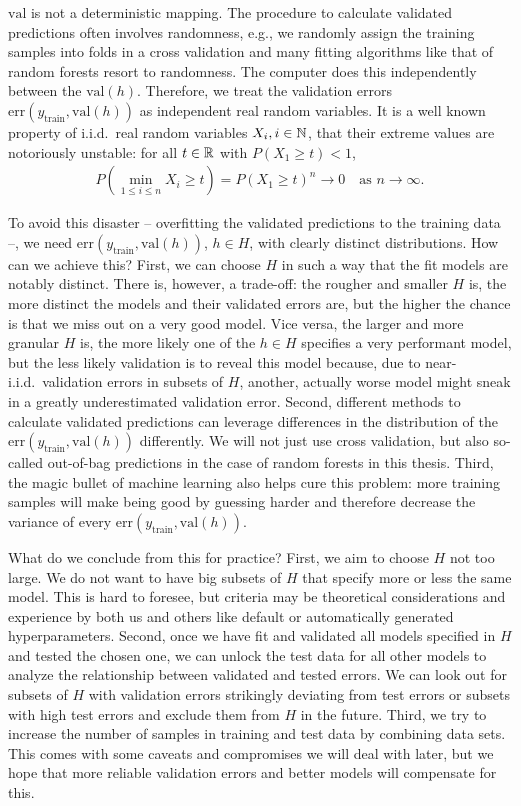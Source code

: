 $\text{val}$ is not a deterministic mapping. The procedure to calculate validated predictions often 
involves randomness, e.g., we randomly assign the training samples into folds in a cross validation 
and many fitting algorithms like that of random forests resort to randomness. The computer does this 
independently between the $\text{val}(h)$. Therefore, we treat the validation errors
$\text{err}(y_\text{train}, \text{val}(h))$ as independent 
real random variables. It is a well known property of i.i.d.\
real random variables $X_i, i \in \mathbb{N}$, that their extreme values are notoriously unstable: for all 
$t \in \mathbb{R}$ with $P(X_1 \geq t) < 1$, 
\begin{align}
    P\left( \min_{1 \leq i \leq n} X_i \geq t \right) = P(X_1 \geq t)^n \to 0 \quad
    \text{as } n \to \infty.
\end{align}

To avoid this disaster -- overfitting the validated predictions to the training 
data --, we need $\text{err}(y_\text{train}, \text{val}(h))$, $h \in H$, with clearly distinct 
distributions. 
How can we achieve this? First, we can choose $H$ in such a way that the fit models are 
notably distinct. There is, however, a trade-off: the rougher and smaller $H$ is, the more distinct 
the models and their validated errors are, but the higher the chance is that we miss out on a very good 
model. Vice versa, the larger and more granular $H$ is, the more likely one of the $h \in H$ 
specifies a very performant model, but the less likely validation is to reveal this model because,
due to near-i.i.d.\ validation errors in subsets of $H$, another, actually worse model might sneak 
in a greatly underestimated validation error. Second, different methods to calculate validated
predictions can leverage differences in the distribution of the 
$\text{err}(y_\text{train}, \text{val}(h))$ differently. We will not just use cross validation, but 
also so-called out-of-bag predictions in the case of random forests in this thesis. Third, the 
magic bullet of machine learning also helps cure this problem: more training samples will make 
being good by guessing harder and therefore decrease the variance of every 
$\text{err}(y_\text{train}, \text{val}(h))$.

What do we conclude from this for practice? First, we aim to choose $H$ not too large.
We do not want to have big subsets of $H$ that specify more or less the same model. This is hard 
to foresee, but criteria may be theoretical considerations and experience by both us and others 
like default or automatically generated hyperparameters. Second, once we have fit and validated 
all models specified in $H$ and tested the chosen one, we can unlock the test data for all other 
models to analyze the relationship between validated and tested errors. We can look out for subsets 
of $H$ with validation errors strikingly deviating from test errors or subsets with high test errors and 
exclude them from $H$ in the future. Third, we try to increase the number of samples in training 
and test data by combining data sets. This comes with some caveats and compromises we will deal with 
later, but we hope that more reliable validation errors and better models will compensate for this.

